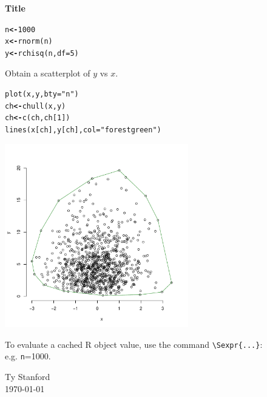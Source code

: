 \documentclass[11pt]{article}\usepackage[]{graphicx}\usepackage[]{color}
\makeatletter
\newcommand{\hlnum}[1]{\textcolor[rgb]{0.533,0,0.133}{#1}}%
\newcommand{\hlstr}[1]{\textcolor[rgb]{0.667,0.267,0}{#1}}%
\newcommand{\hlstd}[1]{\textcolor[rgb]{0,0,0}{#1}}%
\newcommand{\hlkwb}[1]{\textcolor[rgb]{0,0,0.4}{\textbf{#1}}}%
\newcommand{\hlkwc}[1]{\textcolor[rgb]{0,0,0.4}{#1}}%
\newcommand{\hlkwd}[1]{\textcolor[rgb]{0,0.267,0.4}{#1}}%
\newenvironment{kframe}{%
 \def\at@end@of@kframe{}%
 \ifinner\ifhmode%
  \def\at@end@of@kframe{\end{minipage}}%
  \begin{minipage}{\columnwidth}%
 \fi\fi%
 \def\FrameCommand##1{\hskip\@totalleftmargin \hskip-\fboxsep
 \colorbox{shadecolor}{##1}\hskip-\fboxsep
     \hskip-\linewidth \hskip-\@totalleftmargin \hskip\columnwidth}%
 \MakeFramed {\advance\hsize-\width
   \@totalleftmargin\z@ \linewidth\hsize
   \@setminipage}}%
 {\par\unskip\endMakeFramed%
 \at@end@of@kframe}
\newenvironment{knitrout}{}{} %
\newcommand{\byme}{\vspace{10mm}\begin{flushright}\footnotesize{Ty Stanford\\ \today}\end{flushright}\vspace{10mm}}
\makeatother
\begin{document}






\begin{center}
\Large
\textbf{Title}
\end{center}



\begin{knitrout}\footnotesize
{}\color{fgcolor}\begin{kframe}
\begin{alltt}
\hlstd{n} \hlkwb{<-} \hlnum{1000}
\hlstd{x} \hlkwb{<-} \hlkwd{rnorm}\hlstd{(n)}
\hlstd{y} \hlkwb{<-} \hlkwd{rchisq}\hlstd{(n,}\hlkwc{df}\hlstd{=}\hlnum{5}\hlstd{)}
\end{alltt}
\end{kframe}
\end{knitrout}


Obtain a scatterplot of \(y\) vs \(x\). 
\begin{knitrout}\footnotesize
{}\color{fgcolor}\begin{kframe}
\begin{alltt}
\hlkwd{plot}\hlstd{(x, y,} \hlkwc{bty}\hlstd{=}\hlstr{"n"}\hlstd{)}
\hlstd{ch} \hlkwb{<-} \hlkwd{chull}\hlstd{(x,y)}
\hlstd{ch} \hlkwb{<-} \hlkwd{c}\hlstd{(ch,ch[}\hlnum{1}\hlstd{])}
\hlkwd{lines}\hlstd{(x[ch], y[ch],} \hlkwc{col}\hlstd{=}\hlstr{"forestgreen"}\hlstd{)}
\end{alltt}
\end{kframe}

{\centering \includegraphics[width=0.6\textwidth]{fig/knitr/unnamed-chunk-1-1} 

}



\end{knitrout}


To evaluate a cached \textsf{R} object value, use the command \texttt{\textbackslash{}Sexpr\{...\}}:\\
e.g. \texttt{n}=1000.


\byme
\end{document}
